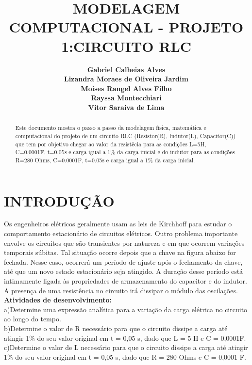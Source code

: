 \documentclass[12pt,fleqn]{article}
\title{MODELAGEM COMPUTACIONAL - PROJETO 1:CIRCUITO RLC}
\author
    {\rm \begin{tabular}{l} 
    \textbf{Gabriel Calheias Alves}\\
    \textbf{Lizandra Moraes de Oliveira Jardim}\\
    \textbf{Moises Rangel Alves Filho}\\
    \textbf{Rayssa Montecchiari}\\
    \textbf{Vitor Saraiva de Lima}\\
  \end{tabular}}
\begin{document}
\pagestyle{pagetstyle}
\maketitle
\thispagestyle{firspagetstyle}

\begin{abstract}
Este documento mostra o passo a passo da modelagem física, matemática e computacional do projeto de um circuito RLC (Resistor(R), Indutor(L), Capacitor(C)) que tem por objetivo chegar ao valor da resistêcia para as condições L=5H, C=0.0001F, t=0.05s e carga igual a 1\% da carga inicial e do indutor para as condições  R=280 Ohms, C=0.0001F, t=0.05s e carga igual a 1\% da carga inicial.
\end{abstract}


\pagestyle{fancy}

\section{INTRODUÇÃO}
Os engenheiros elétricos geralmente usam as leis de Kirchhoff para estudar o comportamento estacionário de circuitos elétricos. Outro problema importante envolve os circuitos que são transientes por natureza e em que ocorrem variações temporais súbitas. Tal situação ocorre depois que a chave na figura abaixo for fechada. Nesse caso, ocorrerá um período de ajuste após o fechamento da chave, até que um novo estado estacionário seja atingido. A duração desse período está intimamente ligada às propriedades de armazenamento do capacitor e do indutor. A presença de uma resistência no circuito irá dissipar o módulo das oscilações.\\

\textbf{Atividades de desenvolvimento:}\\
a)Determine uma expressão analítica para a variação da carga elétrica no circuito ao longo do tempo.\\
b)Determine o valor de R necessário para que o circuito dissipe a carga até atingir 1\% do seu valor original em t = 0,05 s, dado que L = 5 H e C = 0,0001F.\\
c)Determine o valor de L necessário para que o circuito dissipe a carga até atingir 1\% do seu valor original em t = 0,05 s, dado que R = 280 Ohms e C = 0,0001 F.
\end{document}
